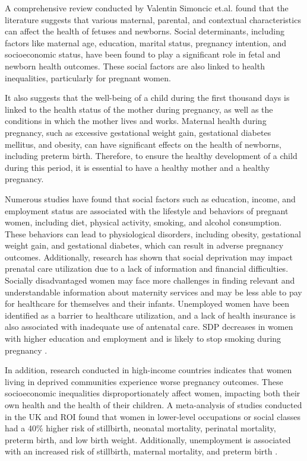 A comprehensive review conducted by Valentin Simoncic et.al. found that the literature suggests that various maternal, parental, and contextual characteristics can affect the health of fetuses and newborns. Social determinants, including factors like maternal age, education, marital status, pregnancy intention, and socioeconomic status, have been found to play a significant role in fetal and newborn health outcomes. These social factors are also linked to health inequalities, particularly for pregnant women.

It also suggests that the well-being of a child during the first thousand days is linked to the health status of the mother during pregnancy, as well as the conditions in which the mother lives and works. Maternal health during pregnancy, such as excessive gestational weight gain, gestational diabetes mellitus, and obesity, can have significant effects on the health of newborns, including preterm birth. Therefore, to ensure the healthy development of a child during this period, it is essential to have a healthy mother and a healthy pregnancy.

Numerous studies have found that social factors such as education, income, and employment status are associated with the lifestyle and behaviors of pregnant women, including diet, physical activity, smoking, and alcohol consumption. These behaviors can lead to physiological disorders, including obesity, gestational weight gain, and gestational diabetes, which can result in adverse pregnancy outcomes. Additionally, research has shown that social deprivation may impact prenatal care utilization due to a lack of information and financial difficulties. Socially disadvantaged women may face more challenges in finding relevant and understandable information about maternity services and may be less able to pay for healthcare for themselves and their infants. Unemployed women have been identified as a barrier to healthcare utilization, and a lack of health insurance is also associated with inadequate use of antenatal care. SDP decreases in women with higher education and employment and is likely to stop smoking during pregnancy \cite{talantikite_2022}.

In addition, research conducted in high-income countries indicates that women living in deprived communities experience worse pregnancy outcomes. These socioeconomic inequalities disproportionately affect women, impacting both their own health and the health of their children. A meta-analysis of studies conducted in the UK and ROI found that women in lower-level occupations or social classes had a 40\% higher risk of stillbirth, neonatal mortality, perinatal mortality, preterm birth, and low birth weight. Additionally, unemployment is associated with an increased risk of stillbirth, maternal mortality, and preterm birth \cite{thomson_2021}.

